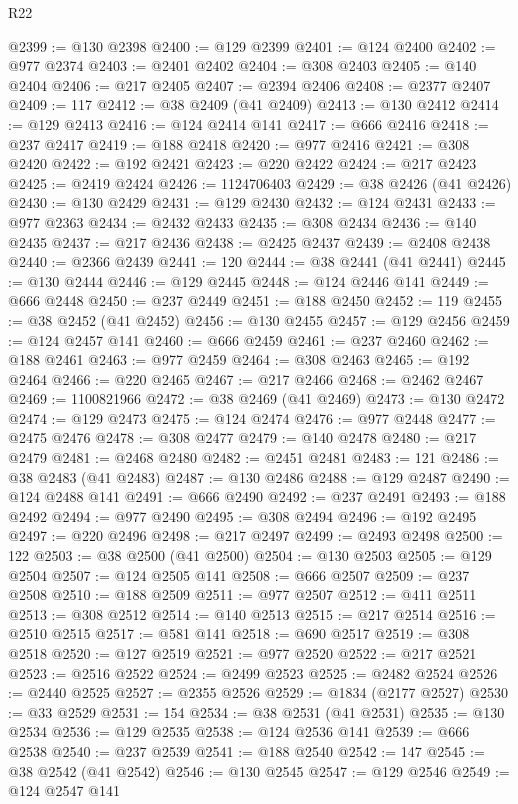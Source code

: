 \begin{lexlean}{R22}
\begin{coremodule}
@2399 := @130 @2398
@2400 := @129 @2399
@2401 := @124 @2400
@2402 := @977 @2374
@2403 := @2401 @2402
@2404 := @308 @2403
@2405 := @140 @2404
@2406 := @217 @2405
@2407 := @2394 @2406
@2408 := @2377 @2407
@2409 := 117
@2412 := @38 @2409 (@41 @2409)
@2413 := @130 @2412
@2414 := @129 @2413
@2416 := @124 @2414 @141
@2417 := @666 @2416
@2418 := @237 @2417
@2419 := @188 @2418
@2420 := @977 @2416
@2421 := @308 @2420
@2422 := @192 @2421
@2423 := @220 @2422
@2424 := @217 @2423
@2425 := @2419 @2424
@2426 := 1124706403
@2429 := @38 @2426 (@41 @2426)
@2430 := @130 @2429
@2431 := @129 @2430
@2432 := @124 @2431
@2433 := @977 @2363
@2434 := @2432 @2433
@2435 := @308 @2434
@2436 := @140 @2435
@2437 := @217 @2436
@2438 := @2425 @2437
@2439 := @2408 @2438
@2440 := @2366 @2439
@2441 := 120
@2444 := @38 @2441 (@41 @2441)
@2445 := @130 @2444
@2446 := @129 @2445
@2448 := @124 @2446 @141
@2449 := @666 @2448
@2450 := @237 @2449
@2451 := @188 @2450
@2452 := 119
@2455 := @38 @2452 (@41 @2452)
@2456 := @130 @2455
@2457 := @129 @2456
@2459 := @124 @2457 @141
@2460 := @666 @2459
@2461 := @237 @2460
@2462 := @188 @2461
@2463 := @977 @2459
@2464 := @308 @2463
@2465 := @192 @2464
@2466 := @220 @2465
@2467 := @217 @2466
@2468 := @2462 @2467
@2469 := 1100821966
@2472 := @38 @2469 (@41 @2469)
@2473 := @130 @2472
@2474 := @129 @2473
@2475 := @124 @2474
@2476 := @977 @2448
@2477 := @2475 @2476
@2478 := @308 @2477
@2479 := @140 @2478
@2480 := @217 @2479
@2481 := @2468 @2480
@2482 := @2451 @2481
@2483 := 121
@2486 := @38 @2483 (@41 @2483)
@2487 := @130 @2486
@2488 := @129 @2487
@2490 := @124 @2488 @141
@2491 := @666 @2490
@2492 := @237 @2491
@2493 := @188 @2492
@2494 := @977 @2490
@2495 := @308 @2494
@2496 := @192 @2495
@2497 := @220 @2496
@2498 := @217 @2497
@2499 := @2493 @2498
@2500 := 122
@2503 := @38 @2500 (@41 @2500)
@2504 := @130 @2503
@2505 := @129 @2504
@2507 := @124 @2505 @141
@2508 := @666 @2507
@2509 := @237 @2508
@2510 := @188 @2509
@2511 := @977 @2507
@2512 := @411 @2511
@2513 := @308 @2512
@2514 := @140 @2513
@2515 := @217 @2514
@2516 := @2510 @2515
@2517 := @581 @141
@2518 := @690 @2517
@2519 := @308 @2518
@2520 := @127 @2519
@2521 := @977 @2520
@2522 := @217 @2521
@2523 := @2516 @2522
@2524 := @2499 @2523
@2525 := @2482 @2524
@2526 := @2440 @2525
@2527 := @2355 @2526
@2529 := @1834 (@2177 @2527)
@2530 := @33 @2529
@2531 := 154
@2534 := @38 @2531 (@41 @2531)
@2535 := @130 @2534
@2536 := @129 @2535
@2538 := @124 @2536 @141
@2539 := @666 @2538
@2540 := @237 @2539
@2541 := @188 @2540
@2542 := 147
@2545 := @38 @2542 (@41 @2542)
@2546 := @130 @2545
@2547 := @129 @2546
@2549 := @124 @2547 @141

\end{coremodule}
\end{lexlean}
